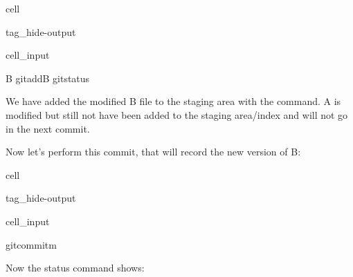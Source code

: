 \documentclass[a4paper,10pt,english]{jupyterBook}
\begin{document}
\begin{sphinxuseclass}{cell}
\begin{sphinxuseclass}{tag_hide-output}\begin{sphinxVerbatimInput}

\begin{sphinxuseclass}{cell_input}
\begin{sphinxVerbatim}[commandchars=\\\{\}]
\PYGZgt{}\PYGZgt{}B
gitaddB
gitstatus
\end{sphinxVerbatim}

\end{sphinxuseclass}\end{sphinxVerbatimInput}

\end{sphinxuseclass}
\end{sphinxuseclass}
\sphinxAtStartPar
We have added the modified B file to the staging area with the  command. A is modified but still not have been added to the staging area/index and will not go in the next commit.

\sphinxAtStartPar
Now let’s perform this commit, that will record the new version of B:

\begin{sphinxuseclass}{cell}
\begin{sphinxuseclass}{tag_hide-output}\begin{sphinxVerbatimInput}

\begin{sphinxuseclass}{cell_input}
\begin{sphinxVerbatim}[commandchars=\\\{\}]
gitcommit\PYGZhy{}m
\end{sphinxVerbatim}

\end{sphinxuseclass}\end{sphinxVerbatimInput}

\end{sphinxuseclass}
\end{sphinxuseclass}
\sphinxAtStartPar
Now the status command shows:
\end{document}
